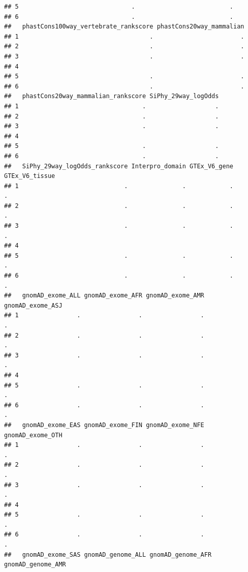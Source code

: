 \documentclass[
]{article}
\begin{document}
\begin{verbatim}
## 5                               .                          .
## 6                               .                          .
##   phastCons100way_vertebrate_rankscore phastCons20way_mammalian
## 1                                    .                        .
## 2                                    .                        .
## 3                                    .                        .
## 4                                                              
## 5                                    .                        .
## 6                                    .                        .
##   phastCons20way_mammalian_rankscore SiPhy_29way_logOdds
## 1                                  .                   .
## 2                                  .                   .
## 3                                  .                   .
## 4                                                       
## 5                                  .                   .
## 6                                  .                   .
##   SiPhy_29way_logOdds_rankscore Interpro_domain GTEx_V6_gene GTEx_V6_tissue
## 1                             .               .            .              .
## 2                             .               .            .              .
## 3                             .               .            .              .
## 4                                                                          
## 5                             .               .            .              .
## 6                             .               .            .              .
##   gnomAD_exome_ALL gnomAD_exome_AFR gnomAD_exome_AMR gnomAD_exome_ASJ
## 1                .                .                .                .
## 2                .                .                .                .
## 3                .                .                .                .
## 4                                                                    
## 5                .                .                .                .
## 6                .                .                .                .
##   gnomAD_exome_EAS gnomAD_exome_FIN gnomAD_exome_NFE gnomAD_exome_OTH
## 1                .                .                .                .
## 2                .                .                .                .
## 3                .                .                .                .
## 4                                                                    
## 5                .                .                .                .
## 6                .                .                .                .
##   gnomAD_exome_SAS gnomAD_genome_ALL gnomAD_genome_AFR gnomAD_genome_AMR

\end{verbatim}
\end{document}
